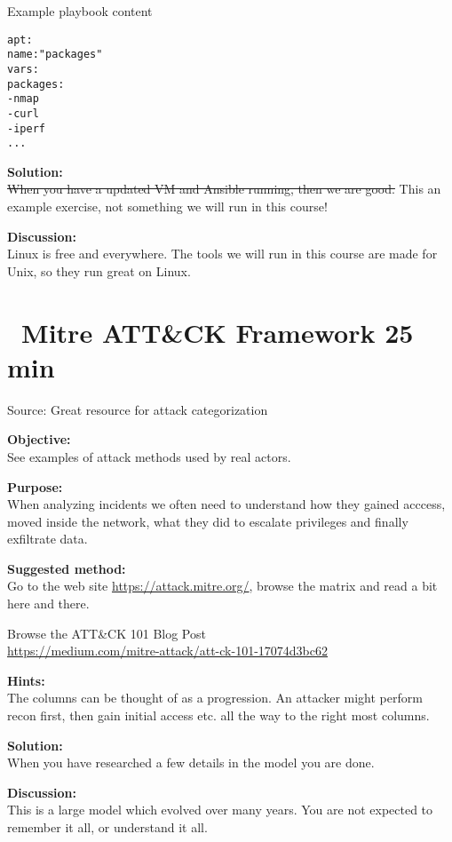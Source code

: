 \documentclass[a4paper,11pt,notitlepage]{report}
\begin{document}
Example playbook content
\begin{alltt}
apt:
      name: "{{ packages }}"
    vars:
      packages:
        - nmap
        - curl
        - iperf
        ...
\end{alltt}

{\bf Solution:}\\
\sout{ When you have a updated VM and Ansible running, then we are good.}
This an example exercise, not something we will run in this course!


{\bf Discussion:}\\
Linux is free and everywhere. The tools we will run in this course are made for Unix, so they run great on Linux.


\chapter{\faExclamationTriangle\ Mitre ATT\&CK Framework 25 min}
\label{ex:mitre-attack}



Source:  Great resource for attack categorization



{\bf Objective:}\\
See examples of attack methods used by real actors.


{\bf Purpose:}\\
When analyzing incidents we often need to understand how they gained acccess, moved inside the network, what they did to escalate privileges and finally exfiltrate data.

{\bf Suggested method:}\\
Go to the web site \url{https://attack.mitre.org/}, browse the matrix and read a bit here and there.

Browse the ATT\&CK 101 Blog Post\\
\url{https://medium.com/mitre-attack/att-ck-101-17074d3bc62}


{\bf Hints:}\\
The columns can be thought of as a progression. An attacker might perform recon first, then gain initial access etc. all the way to the right most columns.

{\bf Solution:}\\
When you have researched a few details in the model you are done.

{\bf Discussion:}\\
This is a large model which evolved over many years. You are not expected to remember it all, or understand it all.
\end{document}
